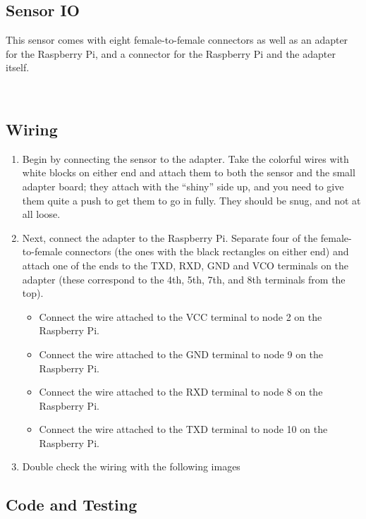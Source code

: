 \documentclass{article}
\begin{document}
\subsection{Sensor IO}

This sensor comes with eight female-to-female connectors as well as an adapter for the Raspberry Pi, and a connector for the Raspberry Pi and the adapter itself.  

\
\subsection{Wiring}

\begin{enumerate}
  \item Begin by connecting the sensor to the adapter. Take the colorful wires with white blocks on either end and attach them to both the sensor and the small adapter board; they attach with the ``shiny'' side up, and you need to give them quite a push to get them to go in fully. They should be snug, and not at all loose.

  \item Next, connect the adapter to the Raspberry Pi.  Separate four of the female-to-female connectors (the ones with the black rectangles on either end) and attach one of the ends to the TXD, RXD, GND and VCO terminals on the adapter (these correspond to the 4th, 5th, 7th, and 8th terminals from the top).  

\begin{itemize}
  \item Connect the wire attached to the VCC terminal to node 2 on the Raspberry Pi.

  \item Connect the wire attached to the GND terminal to node 9 on the Raspberry Pi.

  \item Connect the wire attached to the RXD terminal to node 8 on the Raspberry Pi. 

  \item Connect the wire attached to the TXD terminal to node 10 on the Raspberry Pi.
\end{itemize}

\item Double check the wiring with the following images

\end{enumerate}


\subsection{Code and Testing}
\end{document}
